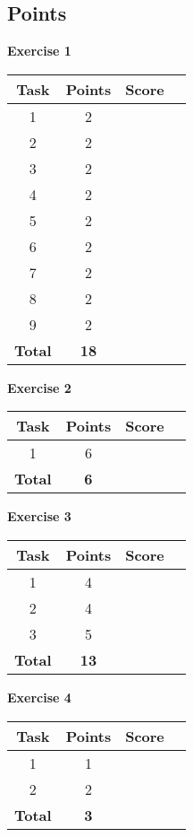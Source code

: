 \documentclass [11pt, a4wide, twoside]{article}
\begin{document}
\subsection*{Points}

\begin{minipage}[t]{120pt}
\textbf{Exercise 1}
\vspace{5pt}\\
\begin{tabular}{|c|c|c|c|}
\hline
Task & Points & Score \\\hline
1  & 2 & \\\hline
2  & 2 & \\\hline
3  & 2 & \\\hline
4  & 2 & \\\hline
5  & 2 & \\\hline
6  & 2 & \\\hline
7  & 2 & \\\hline
8  & 2 & \\\hline
9  & 2 & \\\hline
\textbf{Total} & \textbf{18} &\\\hline\hline
\end{tabular}
\end{minipage}
\begin{minipage}[t]{120pt}


\textbf{Exercise 2}
\vspace{5pt}\\
\begin{tabular}{|c|c|c|c|}
\hline
Task & Points & Score \\\hline
1 & 6 & \\\hline
\textbf{Total} & \textbf{6} &\\\hline\hline
\end{tabular}
\end{minipage}
\begin{minipage}[t]{120pt}


\textbf{Exercise 3}
\vspace{5pt}\\
\begin{tabular}{|c|c|c|c|}
\hline
Task & Points & Score \\\hline
1 & 4 & \\\hline
2 & 4 & \\\hline
3 & 5 & \\\hline
\textbf{Total} & \textbf{13} &\\\hline\hline
\end{tabular}
\end{minipage}
\begin{minipage}[t]{120pt}


\textbf{Exercise 4}
\vspace{5pt}\\
\begin{tabular}{|c|c|c|c|}
\hline
Task & Points & Score \\\hline
1 & 1 & \\\hline
2 & 2 & \\\hline
\textbf{Total} & \textbf{3} &\\\hline\hline
\end{tabular}
\end{minipage}
\end{document}
